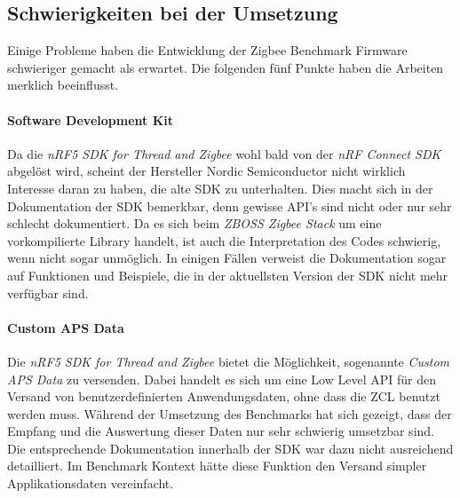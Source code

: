 \subsection{Schwierigkeiten bei der Umsetzung}\label{subsec:ZigbeeSchwierigkeitenbeiderUmsetzung}
Einige Probleme haben die Entwicklung der Zigbee Benchmark Firmware schwieriger gemacht als erwartet.
Die folgenden fünf Punkte haben die Arbeiten merklich beeinflusst. 

\paragraph{Software Development Kit}
Da die \textit{nRF5 SDK for Thread and Zigbee} wohl bald von der \textit{nRF Connect SDK} abgelöst wird, scheint der Hersteller Nordic Semiconductor nicht wirklich Interesse daran zu haben, die \glqq alte\grqq{} SDK zu unterhalten.
Dies macht sich in der Dokumentation der SDK bemerkbar, denn gewisse API's sind nicht oder nur sehr schlecht dokumentiert.
Da es sich beim \textit{ZBOSS Zigbee Stack} um eine vorkompilierte Library handelt, ist auch die Interpretation des Codes schwierig, wenn nicht sogar unmöglich.
In einigen Fällen verweist die Dokumentation sogar auf Funktionen und Beispiele, die in der aktuellsten Version der SDK nicht mehr verfügbar sind.

\paragraph{Custom APS Data}
Die \textit{nRF5 SDK for Thread and Zigbee} bietet die Möglichkeit, sogenannte \textit{Custom APS Data} zu versenden.
Dabei handelt es sich um eine Low Level API für den Versand von benutzerdefinierten Anwendungsdaten, ohne dass die ZCL benutzt werden muss.
Während der Umsetzung des Benchmarks hat sich gezeigt, dass der Empfang und die Auswertung dieser Daten nur sehr schwierig umsetzbar sind.
Die entsprechende Dokumentation innerhalb der SDK war dazu nicht ausreichend detailliert.
Im Benchmark Kontext hätte diese Funktion den Versand simpler Applikationsdaten vereinfacht.

